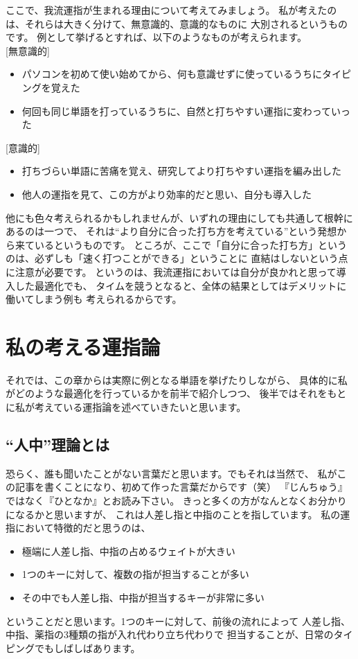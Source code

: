 ここで、我流運指が生まれる理由について考えてみましょう。
私が考えたのは、それらは大きく分けて、無意識的、意識的なものに
大別されるというものです。
例として挙げるとすれば、以下のようなものが考えられます。\\

[無意識的]
\begin{itemize}
 \item パソコンを初めて使い始めてから、何も意識せずに使っているうちにタイピングを覚えた
 \item 何回も同じ単語を打っているうちに、自然と打ちやすい運指に変わっていった
\end{itemize}

[意識的]
\begin{itemize}
 \item 打ちづらい単語に苦痛を覚え、研究してより打ちやすい運指を編み出した
 \item 他人の運指を見て、この方がより効率的だと思い、自分も導入した\\
\end{itemize}

他にも色々考えられるかもしれませんが、いずれの理由にしても共通して根幹にあるのは一つで、
それは“より自分に合った打ち方を考えている”という発想から来ているというものです。
ところが、ここで「自分に合った打ち方」というのは、必ずしも「速く打つことができる」ということに
直結はしないという点に注意が必要です。
というのは、我流運指においては自分が良かれと思って導入した最適化でも、
タイムを競うとなると、全体の結果としてはデメリットに働いてしまう例も
考えられるからです。

\section{私の考える運指論}

それでは、この章からは実際に例となる単語を挙げたりしながら、
具体的に私がどのような最適化を行っているかを前半で紹介しつつ、
後半ではそれをもとに私が考えている運指論を述べていきたいと思います。

\subsection{“人中”理論とは}

恐らく、誰も聞いたことがない言葉だと思います。でもそれは当然で、
私がこの記事を書くことになり、初めて作った言葉だからです（笑）
『じんちゅう』ではなく『ひとなか』とお読み下さい。
きっと多くの方がなんとなくお分かりになるかと思いますが、
これは人差し指と中指のことを指しています。
私の運指において特徴的だと思うのは、
\begin{itemize}
 \item 極端に人差し指、中指の占めるウェイトが大きい
 \item 1つのキーに対して、複数の指が担当することが多い
 \item その中でも人差し指、中指が担当するキーが非常に多い
\end{itemize}
ということだと思います。1つのキーに対して、前後の流れによって
人差し指、中指、薬指の3種類の指が入れ代わり立ち代わりで
担当することが、日常のタイピングでもしばしばあります。
